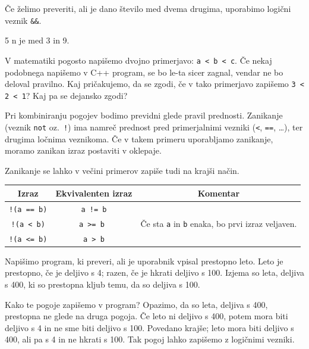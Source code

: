 \documentclass{book}
\begin{document}
\begin{examples}

Če želimo preveriti, ali je dano število med dvema drugima, uporabimo
logični veznik \verb+&&+.


\begin{inout}
5
\tcblower
n je med 3 in 9.
\end{inout}

\end{examples}

\begin{errors}
  V matematiki pogosto napišemo dvojno primerjavo: \verb+a < b < c+.
  Če nekaj podobnega napišemo v C++ program, se bo le-ta sicer zagnal, vendar
  ne bo deloval pravilno. Kaj pričakujemo, da se zgodi, če v tako primerjavo
  zapišemo \verb+3 < 2 < 1+? Kaj pa se dejansko zgodi?
\end{errors}

Pri kombiniranju pogojev bodimo previdni glede pravil prednosti. Zanikanje
(veznik \verb+not+ oz.~\verb+!+) ima namreč prednost pred primerjalnimi
vezniki (\verb+<+, \verb+==+, \ldots), ter drugima ločnima veznikoma.
Če v takem primeru uporabljamo zanikanje, moramo zanikan izraz postaviti
v oklepaje.

\begin{examples}
  Zanikanje se lahko v večini primerov zapiše tudi na krajši način.

  \begin{tabular}{|c|c|c|}
	\hline
	Izraz & Ekvivalenten izraz & Komentar \\
	\hline
	\verb+!(a == b)+ & \verb+a != b+ & \\
	\verb+!(a < b)+ & \verb+a >= b + & Če sta \verb+a+ in \verb+b+ enaka, bo prvi izraz veljaven. \\
	\verb+!(a <= b)+ & \verb+a > b+ & \\
	\hline
  \end{tabular}
\end{examples}

\begin{examples}
Napišimo program, ki preveri, ali je uporabnik vpisal prestopno leto.
Leto je prestopno, če je deljivo s 4; razen, če je hkrati deljivo s 100. Izjema so leta, deljiva
s 400, ki so prestopna kljub temu, da so deljiva s 100.

Kako te pogoje zapišemo v program? Opazimo, da so leta, deljiva s 400,
prestopna ne glede na druga pogoja. Če leto ni deljivo s 400, potem mora biti
deljivo s 4 in ne sme biti deljivo s 100. Povedano krajše; leto mora biti
deljivo s 400, ali pa s 4 in ne hkrati s 100. Tak pogoj lahko zapišemo z
logičnimi vezniki.


\end{examples}
\end{document}
